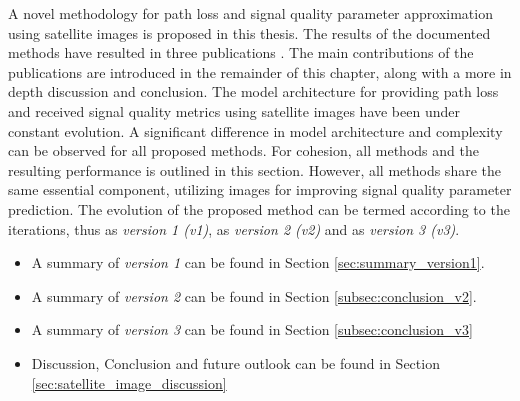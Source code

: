 A novel methodology for path loss and signal quality parameter approximation using satellite images is proposed in this thesis. The results of the documented methods have resulted in three publications \cite{Thrane2018DriveApproximation, Thrane020ModelAidedDeepLearning, Thrane2020DeepKnowledge}. The main contributions of the publications are introduced in the remainder of this chapter, along with a more in depth discussion and conclusion. The model architecture for providing path loss and received signal quality metrics using satellite images have been under constant evolution. A significant difference in model architecture and complexity can be observed for all proposed methods.  For cohesion, all methods and the resulting performance is outlined in this section. However, all methods share the same essential component, utilizing images for improving signal quality parameter prediction. The evolution of the proposed method can be termed according to the iterations, thus \cite{Thrane2018DriveApproximation} as \emph{version 1 (v1)}, \cite{Thrane020ModelAidedDeepLearning} as \emph{version 2 (v2)} and \cite{Thrane2020DeepKnowledge} as \emph{version 3 (v3)}. 
\begin{itemize}
    \item A summary of \emph{version 1} can be found in Section \ref{sec:summary_version1}. 
    \item A summary of \emph{version 2} can be found in Section \ref{subsec:conclusion_v2}. 
    \item A summary of \emph{version 3} can be found in Section \ref{subsec:conclusion_v3}
    \item Discussion, Conclusion and future outlook can be found in Section \ref{sec:satellite_image_discussion}
\end{itemize}
\noindent
